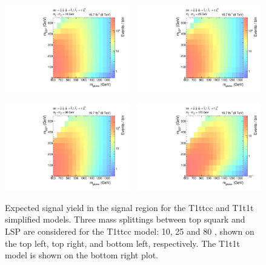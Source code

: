 \begin{figure}[p]
 \centering
 \includegraphics[width=0.48\textwidth]
 {figures/razor_interpretation/events_T1ttcc_DM-10_g1Mbg1W0Ll_mdPhig0p5}
~
 \includegraphics[width=0.48\textwidth]
 {figures/razor_interpretation/events_T1ttcc_DM-25_g1Mbg1W0Ll_mdPhig0p5} 

\includegraphics[width=0.48\textwidth]
{figures/razor_interpretation/events_T1ttcc_DM-80_g1Mbg1W0Ll_mdPhig0p5} 
~
\includegraphics[width=0.48\textwidth]
{figures/razor_interpretation/events_T1t1t_g1Mbg1W0Ll_mdPhig0p5} 
\caption{Expected signal yield in the signal region for the T1ttcc and T1t1t simplified
models. Three mass splittings between top squark and LSP are considered for the T1ttcc model: 10, 25
and 80 \GeV, shown on the top left, top right, and bottom left, respectively. The T1t1t model is
shown on the bottom right plot. 
 \label{fig:events_T1ttcc_T1t1t}}
\end{figure}

